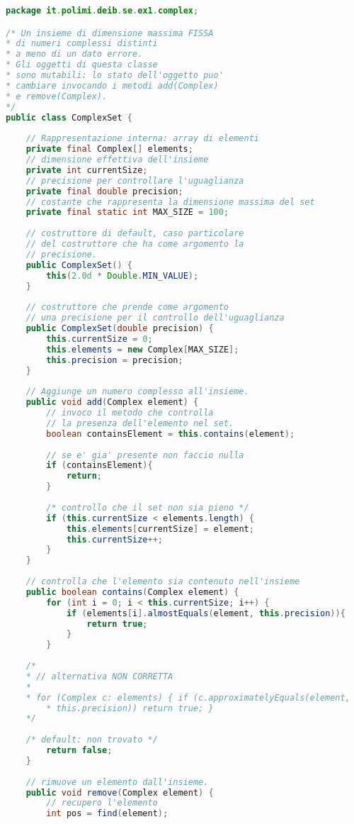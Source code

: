 \documentclass{article}
\begin{document}
\begin{lstlisting}[language=Java,escapechar=|]
package it.polimi.deib.se.ex1.complex;

/* Un insieme di dimensione massima FISSA
* di numeri complessi distinti
* a meno di un dato errore.
* Gli oggetti di questa classe
* sono mutabili: lo stato dell'oggetto puo'
* cambiare invocando i metodi add(Complex)
* e remove(Complex).
*/
public class ComplexSet {
	
	// Rappresentazione interna: array di elementi
	private final Complex[] elements;
	// dimensione effettiva dell'insieme
	private int currentSize;
	// precisione per controllare l'uguaglianza
	private final double precision;
	// costante che rappresenta la dimensione massima del set
	private final static int MAX_SIZE = 100;
	
	// costruttore di default, caso particolare
	// del costruttore che ha come argomento la
	// precisione.
	public ComplexSet() {
		this(2.0d * Double.MIN_VALUE);
	}
	
	// costruttore che prende come argomento
	// una precisione per il controllo dell'uguaglianza
	public ComplexSet(double precision) {
		this.currentSize = 0;
		this.elements = new Complex[MAX_SIZE];
		this.precision = precision;
	}
	
	// Aggiunge un numero complesso all'insieme.
	public void add(Complex element) {
		// invoco il metodo che controlla
		// la presenza dell'elemento nel set.
		boolean containsElement = this.contains(element);
		
		// se e' gia' presente non faccio nulla
		if (containsElement){
		    return;
		}
		
		/* controllo che il set non sia pieno */
		if (this.currentSize < elements.length) {
			this.elements[currentSize] = element;
			this.currentSize++;
		} 
    }
    
    // controlla che l'elemento sia contenuto nell'insieme
    public boolean contains(Complex element) {
        for (int i = 0; i < this.currentSize; i++) {
            if (elements[i].almostEquals(element, this.precision)){
                return true;     
            }
        }
	
	/*
	* // alternativa NON CORRETTA
	*
	* for (Complex c: elements) { if (c.approximatelyEquals(element,
		* this.precision)) return true; }
	*/
	
	/* default: non trovato */
	    return false;
    }
    
    // rimuove un elemento dall'insieme.
    public void remove(Complex element) {
        // recupero l'elemento
        int pos = find(element);
	

\end{lstlisting}
\end{document}
